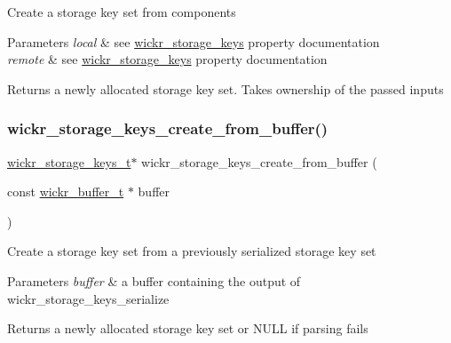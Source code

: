 Create a storage key set from components


\begin{DoxyParams}{Parameters}
{\em local} & see \textquotesingle{}\mbox{\hyperlink{structwickr__storage__keys}{wickr\+\_\+storage\+\_\+keys}}\textquotesingle{} property documentation \\
\hline
{\em remote} & see \textquotesingle{}\mbox{\hyperlink{structwickr__storage__keys}{wickr\+\_\+storage\+\_\+keys}}\textquotesingle{} property documentation \\
\hline
\end{DoxyParams}
\begin{DoxyReturn}{Returns}
a newly allocated storage key set. Takes ownership of the passed inputs 
\end{DoxyReturn}
\mbox{\label{group__wickr__storage__keys_gae5631d93182e635fb7f48269eb3f1723}} 
\subsubsection{\texorpdfstring{wickr\_storage\_keys\_create\_from\_buffer()}{wickr\_storage\_keys\_create\_from\_buffer()}}
{\footnotesize\ttfamily \mbox{\hyperlink{structwickr__storage__keys}{wickr\+\_\+storage\+\_\+keys\+\_\+t}}$\ast$ wickr\+\_\+storage\+\_\+keys\+\_\+create\+\_\+from\+\_\+buffer (\begin{DoxyParamCaption}\item[{const \mbox{\hyperlink{structwickr__buffer}{wickr\+\_\+buffer\+\_\+t}} $\ast$}]{buffer }\end{DoxyParamCaption})}

Create a storage key set from a previously serialized storage key set


\begin{DoxyParams}{Parameters}
{\em buffer} & a buffer containing the output of \textquotesingle{}wickr\+\_\+storage\+\_\+keys\+\_\+serialize\textquotesingle{} \\
\hline
\end{DoxyParams}
\begin{DoxyReturn}{Returns}
a newly allocated storage key set or N\+U\+LL if parsing fails 
\end{DoxyReturn}
\mbox{\label{group__wickr__storage__keys_ga2c1494802577d025d70bf553c43da344}} 
